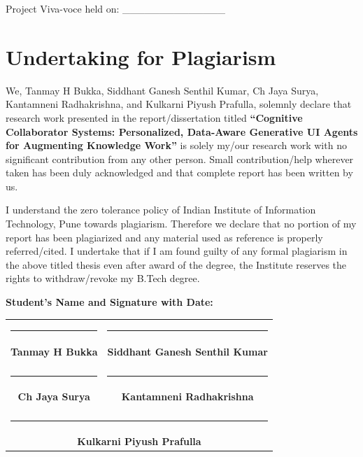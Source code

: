 \documentclass[12pt, a4paper]{report}
\begin{document}
\vspace{3cm}

\noindent Project Viva-voce held on: \_\_\_\_\_\_\_\_\_\_\_\_\_\_

\newpage
\chapter*{Undertaking for Plagiarism}

We, Tanmay H Bukka, Siddhant Ganesh Senthil Kumar, Ch Jaya Surya, Kantamneni Radhakrishna, and Kulkarni Piyush Prafulla, solemnly declare that research work presented in the report/dissertation titled \textbf{“Cognitive Collaborator Systems: Personalized, Data-Aware Generative UI Agents for Augmenting Knowledge Work”} is solely my/our research work with no significant contribution from any other person. Small contribution/help wherever taken has been duly acknowledged and that complete report has been written by us. 

I understand the zero tolerance policy of Indian Institute of Information Technology, Pune towards plagiarism. Therefore we declare that no portion of my report has been plagiarized and any material used as reference is properly referred/cited. I undertake that if I am found guilty of any formal plagiarism in the above titled thesis even after award of the degree, the Institute reserves the rights to withdraw/revoke my B.Tech degree.

\vspace{2cm}

\noindent \textbf{Student’s Name and Signature with Date:}

\vspace{1cm}
\begin{table}[H]
    \centering
    \begin{tabular}{cc}
    \rule{6cm}{1pt} & \rule{6cm}{1pt} \\
    \textbf{Tanmay H Bukka} & \textbf{Siddhant Ganesh Senthil Kumar} \\
    \vspace{1.5cm} & \vspace{1.5cm} \\
    \rule{6cm}{1pt} & \rule{6cm}{1pt} \\
    \textbf{Ch Jaya Surya} & \textbf{Kantamneni Radhakrishna} \\
    \vspace{1.5cm} & \vspace{1.5cm} \\
    \multicolumn{2}{c}{\rule{6cm}{1pt}} \\
    \multicolumn{2}{c}{\textbf{Kulkarni Piyush Prafulla}} \\
    \end{tabular}
\end{table}
\end{document}
